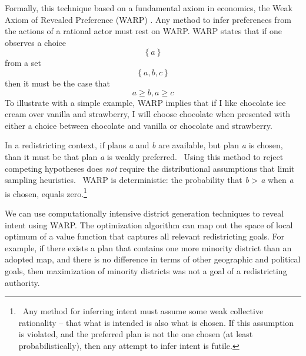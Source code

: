 \documentclass[article]{JSSstyle/jss}
\begin{document}
Formally, this technique based on a fundamental axiom in economics, the Weak Axiom
of Revealed Preference (WARP) \citep[][]{Samuelson48}. Any method to infer preferences
from the actions of a rational actor must rest on WARP.  WARP states
that if one observes a choice 
\[
\left\{ a \right\}
\]
 from a set 
\[
\left\{ {a,b,c} \right\}
\]
  then it must be the case that
\[
a \ge b,a \ge c
\]
To illustrate with a simple example, WARP implies that if I like
chocolate ice cream over vanilla and strawberry, I will choose
chocolate when presented with either a choice between chocolate and
vanilla or chocolate and strawberry. 

In a redistricting context, if plans \textit{a} and \textit{b} are available, but 
plan \textit{a} is
chosen, than it must be that plan \textit{a} is weakly preferred.
\ Using this method to reject competing hypotheses does \textit{not}
require the distributional assumptions that limit sampling heuristics.
\ WARP is deterministic: the probability that \textit{b }{\textgreater}
\textit{a} when \textit{a} is chosen, equals zero.\footnote{\ Any
method for inferring intent must assume some weak collective
rationality -- that what is intended is also what is chosen. If this
assumption is violated, and the preferred plan is not the one chosen
(at least probabilistically), then any attempt to infer intent is
futile.}

We can use computationally intensive district generation techniques 
to reveal intent using WARP.  The optimization algorithm can  
map out the space of local optimum of a value function that captures all relevant 
redistricting goals.  For example, if there exists a plan that contains one more 
minority district than an adopted map, and there is no difference in terms of other
geographic and political goals, then maximization of minority districts was not a 
goal of a redistricting authority.
\end{document}
